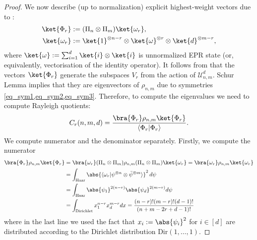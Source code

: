 \documentclass[aps,twocolumn,pra,superscriptaddress,nofootinbib]{revtex4-2}
\newcommand{\brakett}[2]{\langle #1 \vert #2 \rangle}
\newcommand{\mU}{\mathcal{U}}
\newcommand{\xp}[1]{^{\otimes #1}}
\begin{document}
\begin{proof}
    We now describe (up to normalization) explicit highest-weight vectors due to \cite{benkart1994tensor}:
    \begin{align}
        \ket{\Phi_r} &:= (\Pi_n \otimes \Pi_m) \ket{\omega_r}, \\\ket{\omega_r} &:= \ket{1}\xp{n-r} \otimes \ket{\omega}\xp{r} \otimes \ket{d}\xp{m-r},
    \end{align}
    where $\ket{\omega} := \sum_{i=1}^d \ket{i} \otimes \ket{i}$ is unnormalized EPR state (or, equivalently, vectorisation of the identity operator). It follows from \cite{benkart1994tensor} that the vectors $\ket{\Phi_r}$ generate the subspaces $V_r$ from the action of $\mU_{n,m}^d$. Schur Lemma implies that they are eigenvectors of $\rho_{n,m}$ due to symmetries \cref{eq_sym1,eq_sym2,eq_sym3}. Therefore, to compute the eigenvalues we need to compute Rayleigh quotients:
    \begin{equation}
        C_r(n,m,d) = \frac{\bra{\Phi_r}\rho_{n,m}\ket{\Phi_r}}{\brakett{\Phi_r}{\Phi_r}}.
    \end{equation}
    We compute numerator and the denominator separately. Firstly, we compute the numerator
    \begin{align}
        \bra{\Phi_r}\rho_{n,m}\ket{\Phi_r} &= \bra{\omega_r}(\Pi_{n} \otimes \Pi_{m})\rho_{n,m}(\Pi_{n} \otimes \Pi_{m})\ket{\omega_r} 
        = \bra{\omega_r} \rho_{n,m} \ket{\omega_r} \\
        &= \int_{\mathrm{Haar}} \abs{\brakett{\omega_r}{\psi\xp{n}\otimes\bar{\psi}\xp{m}}}^2 \, d\psi \\
        &= \int_{\mathrm{Haar}} \abs{\psi_1}^{2(n-r)} \abs{\psi_d}^{2(m-r)} d\psi \\
        &= \int_{\mathrm{Dirichlet}} x_1^{n-r} x_d^{m-r} dx = \frac{(n-r)!(m-r)!(d-1)!}{(n+m-2r+d-1)!}
    \end{align}
    where in the last line we used the fact that $x_i := \abs{\psi_i}^{2}$ for $i \in [d]$ are distributed according to the Dirichlet distribution $\mathrm{Dir}(1,\dotsc,1)$.


\end{proof}
\end{document}
